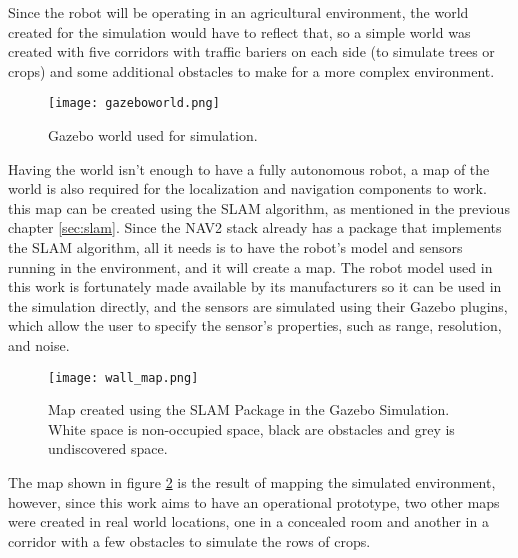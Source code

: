 Since the robot will be operating in an agricultural environment, the world created for 
the simulation would have to reflect that, so a simple world was created with five 
corridors with traffic bariers on each side (to simulate trees or crops) and some additional 
obstacles to make for a more complex environment.
\begin{figure}[H]
    \centering
    \texttt{[image: gazeboworld.png]}
    \caption{Gazebo world used for simulation.}
    \label{fig:gazebo_world}
\end{figure}

Having the world isn't enough to have a fully autonomous robot, a map 
of the world is also required for the localization and navigation components to work. 
this map can be created using the \gls{SLAM} algorithm, as mentioned in the previous chapter \ref{sec:slam}. 
Since the \gls{NAV2} stack already has a package that implements the \gls{SLAM} algorithm, all it needs is to 
have the robot's model and sensors running in the environment, and it will create a map.
The robot model used in this work is fortunately made available by its manufacturers 
so it can be used in the simulation directly, and the sensors are simulated using their 
Gazebo plugins, which allow the user to specify the sensor's properties, such as range, resolution, and noise.
\clearpage
\begin{figure}
    \centering
    \texttt{[image: wall\_map.png]}
    \caption{Map created using the SLAM Package in the Gazebo Simulation. White space is non-occupied space, black are obstacles and grey is undiscovered space.}
    \label{fig:slam_map}
\end{figure}

The map shown in figure \ref{fig:slam_map} is the result of mapping the simulated environment, 
however, since this work aims to have an operational prototype, two other maps were created 
in real world locations, one in a concealed room and another in a corridor with a few obstacles to simulate the rows 
of crops. 

